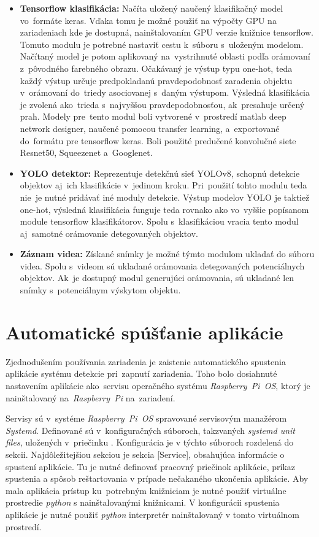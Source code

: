 \begin{itemize}
                \item \textbf{Tensorflow klasifikácia:} Načíta uložený naučený klasifikačný model vo~formáte keras. Vďaka tomu je možné použiť na výpočty GPU na zariadeniach kde je dostupná, nainštalovaním GPU verzie knižnice tensorflow. Tomuto modulu je potrebné nastaviť cestu k~súboru s~uloženým modelom. Načítaný model je potom aplikovaný na~vystrihnuté oblasti podľa orámovaní z~pôvodného farebného obrazu. Očakávaný je výstup typu one-hot, teda každý výstup určuje predpokladanú pravdepodobnosť zaradenia objektu v~orámovaní do~triedy asociovanej s~daným výstupom. Výsledná klasifikácia je zvolená ako~trieda s~najvyššou pravdepodobnosťou, ak~presahuje určený prah. Modely pre~tento modul boli vytvorené v~prostredí matlab deep network designer, naučené pomocou transfer learning, a~exportované do~formátu pre tensorflow keras. Boli použité predučené konvolučné siete Resnet50, Squeezenet a~Googlenet.
                \item \textbf{YOLO detektor:} Reprezentuje detekčnú sieť YOLOv8, schopnú detekcie objektov aj~ich klasifikácie v~jedinom kroku. Pri~použití tohto modulu teda nie~je nutné pridávať iné moduly detekcie. Výstup modelov YOLO je taktiež one-hot, výsledná klasifikácia funguje teda rovnako ako vo~vyššie popísanom module tensorflow klasifikátorov. Spolu s~klasifikáciou vracia tento modul aj~samotné orámovanie detegovaných objektov.
                \item \textbf{Záznam videa:} Získané snímky je možné týmto modulom ukladať do súboru videa. Spolu s~videom sú ukladané orámovania detegovaných potenciálnych objektov. Ak~je dostupný modul generujúci orámovania, sú ukladané len snímky s~potenciálnym výskytom objektu.
            \end{itemize}

    \section{Automatické spúšťanie aplikácie}
        Zjednodušením používania zariadenia je zaistenie automatického spustenia aplikácie systému detekcie pri~zapnutí zariadenia. Toho bolo dosiahnuté nastavením aplikácie ako~servisu operačného systému \emph{Raspberry~Pi~OS}, ktorý je nainštalovaný na~\emph{Raspberry~Pi} na~zariadení.

        Servisy sú v~systéme \emph{Raspberry~Pi~OS} spravované servisovým manažérom \emph{Systemd}. Definované sú v~konfiguračných súboroch, takzvaných \emph{systemd unit files}, uložených v~priečinku . Konfigurácia je v týchto súboroch rozdelená do sekcii. Najdôležitejšiou sekciou je sekcia [Service], obsahujúca informácie o spustení aplikácie. Tu je nutné definovať pracovný priečinok aplikácie, príkaz spustenia a spôsob reštartovania v prípade nečakaného ukončenia aplikácie. Aby mala aplikácia prístup ku~potrebným knižniciam je nutné použiť virtuálne prostredie \emph{python} s nainštalovanými knižnicami. V konfigurácii spustenia aplikácie je nutné použiť \emph{python} interpretér nainštalovaný v tomto virtuálnom prostredí.

